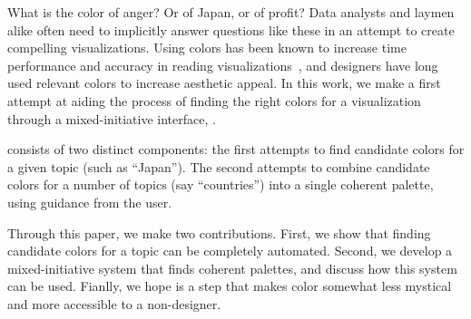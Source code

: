 What is the color of anger? Or of Japan, or of profit? Data analysts and laymen alike often need to implicitly answer questions like these in an attempt to create compelling visualizations. Using colors has been known to increase time performance and accuracy in reading visualizations~\cite{hoadley1990investigating}, and designers have long used relevant colors to increase aesthetic appeal. In this work, we make a first attempt at aiding the process of finding the right colors for a visualization through a mixed-initiative interface, \system.

\system consists of two distinct components: the first attempts to find candidate colors for a given topic (such as ``Japan''). The second attempts to combine candidate colors for a number of topics (say ``countries'') into a single coherent palette, using guidance from the user.

Through this paper, we make two contributions. First, we show that finding candidate colors for a topic can be completely automated. Second, we develop a mixed-initiative system that finds coherent palettes, and discuss how this system can be used. Fianlly, we hope \system is a step that makes color somewhat less mystical and more accessible to a non-designer.
